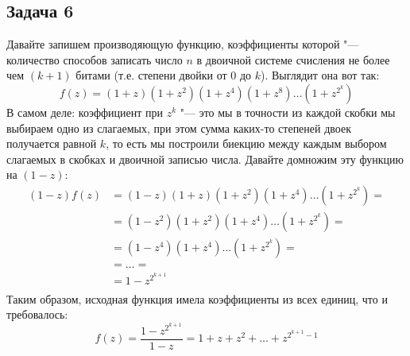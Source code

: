 \subsection{Задача 6}
	Давайте запишем производяющую функцию, коэффициенты которой "--- количество способов записать число $n$
	в двоичной системе счисления не более чем $(k+1)$ битами (т.е. степени двойки от 0 до $k$).
	Выглядит она вот так:
	\[ f(z) = (1+z)(1+z^2)(1+z^4)(1+z^8)\dots(1+z^{2^k}) \]
	В самом деле: коэффициент при $z^k$ "--- это мы в точности из каждой скобки мы выбираем одно из слагаемых,
	при этом сумма каких-то степеней двоек получается равной $k$, то есть мы построили биекцию
	между каждым выбором слагаемых в скобках и двоичной записью числа.
	Давайте домножим эту функцию на $(1-z)$:
	\begin{align*}
		(1-z)f(z)
		&= (1-z)(1+z)(1+z^2)(1+z^4)\dots(1+z^{2^k}) = \\
		&= (1-z^2)(1+z^2)(1+z^4)\dots(1+z^{2^k}) = \\
		&= (1-z^4)(1+z^4)\dots(1+z^{2^k}) = \\
		&= \dots = \\
		&= 1-z^{2^{k+1}} \\
	\end{align*}
	Таким образом, исходная функция имела коэффициенты из всех единиц, что и требовалось:
	\[
		f(z) = \frac{1-z^{2^{k+1}}}{1-z} = 1 + z + z^2 + \dots + z^{2^{k+1}-1}
	\]

